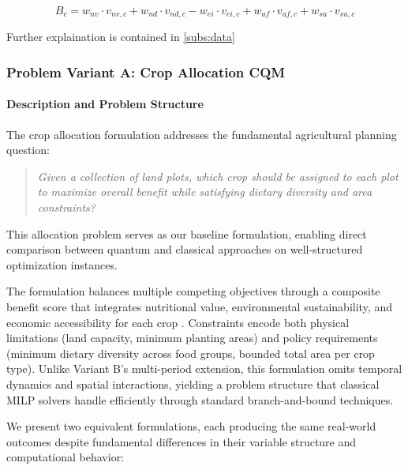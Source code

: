 \documentclass{oqireport}
\begin{document}
\begin{equation}
B_c = w_{nv} \cdot v_{nv,c} + w_{nd} \cdot v_{nd,c} - w_{ei} \cdot v_{ei,c} + w_{af} \cdot v_{af,c} + w_{su} \cdot v_{su,c}
\label{eq:benefit}
\end{equation}

Further explaination is contained in \cref{subs:data}





\subsubsection{Problem Variant A: Crop Allocation CQM}
\label{subsec:formulation_a}

\paragraph{Description and Problem Structure}

The crop allocation formulation addresses the fundamental agricultural planning question: 

\begin{quote}
    \textit{Given a collection of land plots, which crop should be assigned to each plot to maximize overall benefit while satisfying dietary diversity and area constraints?}
\end{quote} 


This allocation problem serves as our baseline formulation, enabling direct comparison between quantum and classical approaches on well-structured optimization instances.

The formulation balances multiple competing objectives through a composite benefit score that integrates nutritional value, environmental sustainability, and economic accessibility for each crop \cite{esteso_sustainable_2023}. Constraints encode both physical limitations (land capacity, minimum planting areas) and policy requirements (minimum dietary diversity across food groups, bounded total area per crop type). Unlike Variant B's multi-period extension, this formulation omits temporal dynamics and spatial interactions, yielding a problem structure that classical MILP solvers handle efficiently through standard branch-and-bound techniques.

We present two equivalent formulations, each producing the same real-world outcomes despite fundamental differences in their variable structure and computational behavior:
\end{document}

